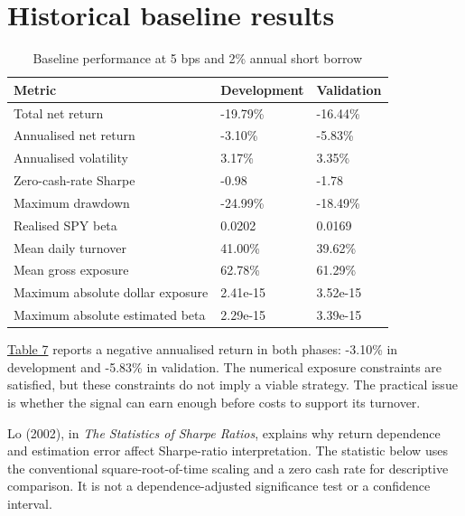 \documentclass[12pt,a4paper,oneside]{article}
\newcommand{\bodyheading}[1]{\clearpage\section{#1}}
\begin{document}
\bodyheading{Historical baseline results}

\begingroup
\setcounter{table}{6}
\fontsize{10}{12.5}\selectfont
\renewcommand{\arraystretch}{1.12}
\begin{table}[!htbp]
\centering
{}\fontsize{10}{12.5}\selectfont
\begin{tabular}{P{0.490000\dimexpr{}\tabcolsep\relax}Q{0.255000\dimexpr{}\tabcolsep\relax}Q{0.255000\dimexpr{}\tabcolsep\relax}}
\toprule
{} \textbf{Metric} & \textbf{Development} & \textbf{Validation} \\ \midrule
Total net return & -19.79\% & -16.44\% \\
\midrule[0.2pt]
Annualised net return & -3.10\% & -5.83\% \\
\midrule[0.2pt]
Annualised volatility & 3.17\% & 3.35\% \\
\midrule[0.2pt]
Zero-cash-rate Sharpe & -0.98 & -1.78 \\
\midrule[0.2pt]
Maximum drawdown & -24.99\% & -18.49\% \\
\midrule[0.2pt]
Realised SPY beta & 0.0202 & 0.0169 \\
\midrule[0.2pt]
Mean daily turnover & 41.00\% & 39.62\% \\
\midrule[0.2pt]
Mean gross exposure & 62.78\% & 61.29\% \\
\midrule[0.2pt]
Maximum absolute dollar exposure & 2.41e-15 & 3.52e-15 \\
\midrule[0.2pt]
Maximum absolute estimated beta & 2.29e-15 & 3.39e-15 \\
\bottomrule
\end{tabular}
\caption{Baseline performance at 5 bps and 2\% annual short borrow}\label{tab:7}
\end{table}
\endgroup

\hyperref[tab:7]{Table 7} reports a negative annualised return in both phases: -3.10\% in development and -5.83\% in validation. The numerical exposure constraints are satisfied, but these constraints do not imply a viable strategy. The practical issue is whether the signal can earn enough before costs to support its turnover.


Lo (2002), in \textit{The Statistics of Sharpe Ratios}, explains why return dependence and estimation error affect Sharpe-ratio interpretation. The statistic below uses the conventional square-root-of-time scaling and a zero cash rate for descriptive comparison. It is not a dependence-adjusted significance test or a confidence interval.
\end{document}
